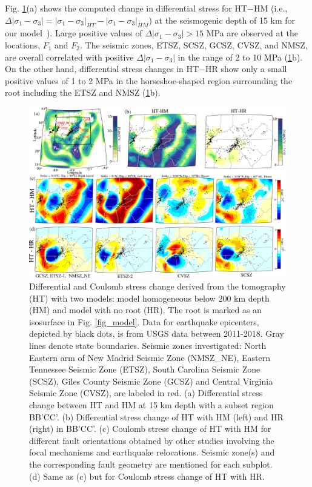 \documentclass[draft,linenumbers]{agujournal2018}
\begin{document}
Fig. \ref{model_results}(a) shows the computed change in differential stress for HT$-$HM (i.e., $\Delta|\sigma_1 - \sigma_3| = |\sigma_1 - \sigma_3|_{HT} - |\sigma_1 - \sigma_3|_{HM}$) at the seismogenic depth of 15 km for our model~\citep[e.g.,][]{mazzotti2010state}). Large positive values of $\Delta |\sigma_1 - \sigma_3|>15$ MPa are observed at the locations, $F_1$ and $F_2$. The seismic zones, ETSZ, SCSZ, GCSZ, CVSZ, and NMSZ, are overall correlated with positive $\Delta |\sigma_1 - \sigma_3|$ in the range of 2 to 10 MPa (\ref{model_results}b). On the other hand, differential stress changes in HT$-$HR show only a small positive values of 1 to 2 MPa in the horseshoe-shaped region surrounding the root including the ETSZ and NMSZ (\ref{model_results}b).
%
\begin{figure}[h!]
    \centering
    \includegraphics[width=\linewidth]{figures/model_results.png}
    \caption{Differential and Coulomb stress change derived from the tomography (HT) with two models: model homogeneous below 200 km depth (HM) and model with no root (HR). The root is marked as an isosurface in Fig. \ref{fig_model}. Data for earthquake epicenters, depicted by black dots, is from USGS data between 2011-2018.  Gray lines denote state boundaries. Seismic zones investigated: North Eastern arm of New Madrid Seismic Zone (NMSZ\_NE), Eastern Tennessee Seismic Zone (ETSZ), South Carolina Seismic Zone (SCSZ), Giles County Seismic Zone (GCSZ) and Central Virginia Seismic Zone (CVSZ), are labeled in red. (a) Differential stress change between HT and HM at 15 km depth with a subset region BB'CC'. (b) Differential stress change of HT with HM (left) and HR (right) in BB'CC'. (c) Coulomb stress change of HT with HM for different fault orientations obtained by other studies involving the focal mechanisms and earthquake relocations. Seismic zone(s) and the corresponding fault geometry are mentioned for each subplot. (d) Same as (c) but for Coulomb stress change of HT with HR. }
    \label{model_results}
\end{figure}
\end{document}
